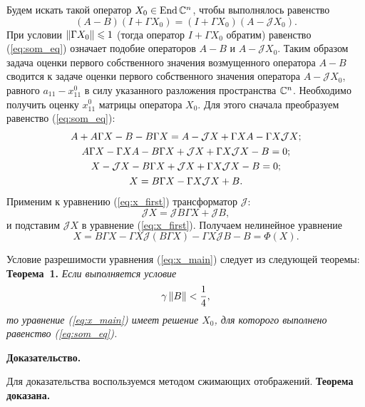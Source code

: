 
Будем искать такой оператор $X_0 \in \operatorname{End}\mathbb{C}^n$, чтобы выполнялось равенство
\begin{equation}\label{eq:som_eq}
	(A-B)(I + \Gamma X_0) = (I + \Gamma X_0)(A-\mathcal{J}X_0).
\end{equation}
При условии $\left\|\Gamma X_0\right\| \leqslant 1$ (тогда оператор $I + \Gamma X_0$ обратим) равенство (\ref{eq:som_eq}) означает подобие операторов $A-B$ и $A-\mathcal{J} X_0$. Таким образом задача оценки первого собственного значения возмущенного оператора $A-B$ сводится к задаче оценки первого собственного значения оператора $A-\mathcal{J}X_0$, равного $a_{11} - x^{0}_{11}$ в силу указанного разложения пространства $\mathbb{C}^n$. Необходимо получить оценку $x^{0}_{11}$ матрицы оператора $X_0$. Для этого сначала преобразуем равенство (\ref{eq:som_eq}):
\begin{gather}
	A + A\Gamma X - B - B\Gamma X = A - \mathcal{J}X + \Gamma X A - \Gamma X \mathcal{J}X; \notag \\
	A\Gamma X - \Gamma X A - B\Gamma X + \mathcal{J}X + \Gamma X \mathcal{J}X - B = 0; \notag \\
	X - \mathcal{J}X - B\Gamma X + \mathcal{J}X + \Gamma X \mathcal{J}X - B = 0;  \notag \\
	X = B\Gamma X - \Gamma X \mathcal{J}X + B. \label{eq:x_first}
\end{gather}
Применим к уравнению (\ref{eq:x_first}) трансформатор $\mathcal{J}$:
$$
	\mathcal{J}X = \mathcal{J}B\Gamma X + \mathcal{J}B,
$$ 
и подставим $\mathcal{J}X$ в уравнение (\ref{eq:x_first}). Получаем нелинейное уравнение
\begin{equation}\label{eq:x_main}
	X = B\Gamma X - \Gamma X \mathcal{J}(B\Gamma X) - \Gamma X \mathcal{J}B - B = \Phi(X).
\end{equation}

Условие разрешимости уравнения (\ref{eq:x_main}) следует из следующей теоремы:
\noindent\textbf{Теорема~1.}
{ \it Если выполняется условие}
$$
	\gamma\left\|B\right\| < \frac{1}{4},
$$
{\it то уравнение (\ref{eq:x_main}) имеет решение $X_0$, для которого выполнено равенство (\ref{eq:som_eq}).}

\noindent\textbf{Доказательство.}

Для доказательства воспользуемся методом сжимающих отображений. 
\textbf{Теорема доказана.}

